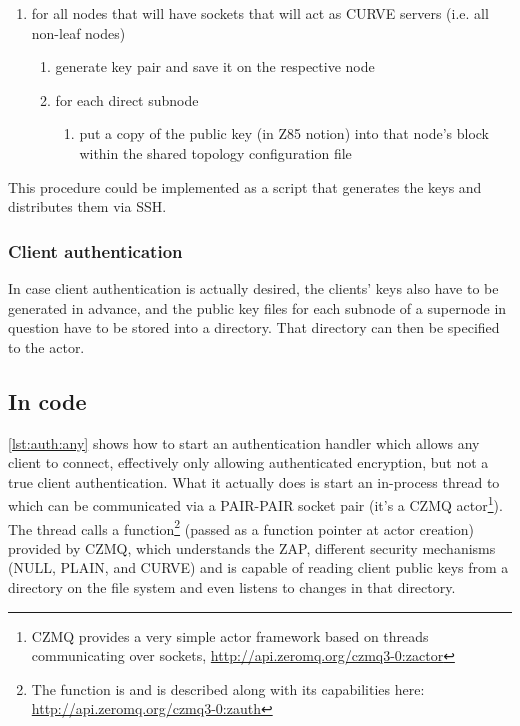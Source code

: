 \begin{enumerate}
	\item for all nodes that will have sockets that will act as CURVE servers (i.e. all non-leaf nodes)
	\begin{enumerate}
		\item generate key pair and save it on the respective node
		\item for each direct subnode
		\begin{enumerate}
			\item put a copy of the public key (in Z85 notion) into that node's block within the shared topology configuration file
		\end{enumerate}
	\end{enumerate}
\end{enumerate}

This procedure could be implemented as a script that generates the keys and
distributes them via \gls{SSH}.

\subsubsection{Client authentication}
In case client authentication is actually desired, the clients' keys also have
to be generated in advance, and the public key files for each subnode of a
supernode in question have to be stored into a directory. That directory can
then be specified to the  actor.

\subsection{In code}
\autoref{lst:auth:any} shows how to start an authentication handler which
allows any client to connect, effectively only allowing authenticated
encryption, but not a true client authentication. What it actually does is
start an in-process thread to which can be communicated via a PAIR-PAIR socket
pair (it's a CZMQ actor\footnote{CZMQ provides a very simple actor framework
based on threads communicating over \zmq sockets,
\url{http://api.zeromq.org/czmq3-0:zactor}}). The thread calls a
function\footnote{The function is  and is described along
with its capabilities here: \url{http://api.zeromq.org/czmq3-0:zauth}} (passed
as a function pointer at actor creation) provided by CZMQ, which understands
the \gls{ZAP}, different security mechanisms (NULL, PLAIN, and CURVE) and is
capable of reading client public keys from a directory on the file system and
even listens to changes in that directory.

